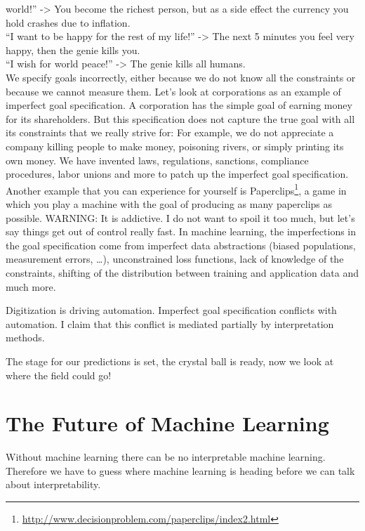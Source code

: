 \documentclass[12pt,]{krantz}
\renewcommand{\href}[2]{#2\footnote{\url{#1}}}
\begin{document}
\begin{enumerate}
  world!'' -\textgreater{} You become the richest person, but as a side
  effect the currency you hold crashes due to inflation.\\
  ``I want to be happy for the rest of my life!'' -\textgreater{} The
  next 5 minutes you feel very happy, then the genie kills you.\\
  ``I wish for world peace!'' -\textgreater{} The genie kills all
  humans.\\
  We specify goals incorrectly, either because we do not know all the
  constraints or because we cannot measure them. Let's look at
  corporations as an example of imperfect goal specification. A
  corporation has the simple goal of earning money for its shareholders.
  But this specification does not capture the true goal with all its
  constraints that we really strive for: For example, we do not
  appreciate a company killing people to make money, poisoning rivers,
  or simply printing its own money. We have invented laws, regulations,
  sanctions, compliance procedures, labor unions and more to patch up
  the imperfect goal specification. Another example that you can
  experience for yourself is
  \href{http://www.decisionproblem.com/paperclips/index2.html}{Paperclips},
  a game in which you play a machine with the goal of producing as many
  paperclips as possible. WARNING: It is addictive. I do not want to
  spoil it too much, but let's say things get out of control really
  fast. In machine learning, the imperfections in the goal specification
  come from imperfect data abstractions (biased populations, measurement
  errors, \ldots{}), unconstrained loss functions, lack of knowledge of
  the constraints, shifting of the distribution between training and
  application data and much more.
\end{enumerate}

Digitization is driving automation. Imperfect goal specification
conflicts with automation. I claim that this conflict is mediated
partially by interpretation methods.

The stage for our predictions is set, the crystal ball is ready, now we
look at where the field could go!

\section{The Future of Machine
Learning}\label{the-future-of-machine-learning}

Without machine learning there can be no interpretable machine learning.
Therefore we have to guess where machine learning is heading before we
can talk about interpretability.
\end{document}
